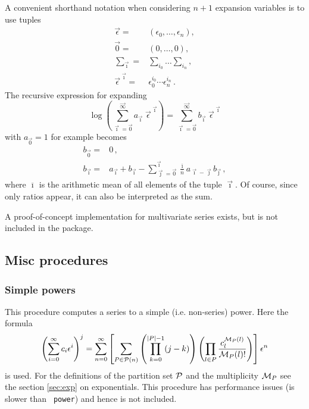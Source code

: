 \documentclass{article}
\begin{document}
A convenient shorthand notation when considering $n+1$ expansion variables is to
use tuples
\begin{align}
\label{eq:multivar_conv}
\vec{\epsilon}=&(\epsilon_0,\dots,\epsilon_n), \\
\vec{0}=&(0,\dots,0), \\
\sum_{\vec{\imath}}=&\sum_{i_0}\dots\sum_{i_n}, \\
\vec{\epsilon}^{\;\vec{\imath}} =& \epsilon_0^{i_0 }\cdots\epsilon_n^{i_n}\,.
\end{align}
The recursive expression for expanding
\begin{equation}
  \label{eq:log_multivar}
\log\left(\sum_{\vec{\imath}=\vec{0}}^{\vec{\infty}}a_{\vec{\imath}}\;
 \vec{\epsilon}^{\;\vec{\imath}}\right)=\sum_{\vec{\imath}=\vec{0}}^{\vec{\infty}} b_{\vec{\imath}}\;\vec{\epsilon}^{\;\vec{\imath}}
 \end{equation}
with $a_{\vec{0}}=1$ for example becomes
\begin{align}
  \label{eq:rec_log_multivar}
  b_{\vec{0}}=&0\,,\\
b_{\vec{\imath}}=&a_{\vec{\imath}}+b_{\vec{\imath}}-\sum_{\vec{\jmath}=\vec{0}}^{\vec{\imath}}
\frac{\overline{\imath}}{\overline{n}} a_{\vec{\imath}-\vec{\jmath}} b_{\vec{\jmath}}\,,
 \end{align}
where $\overline{\imath}$ is the arithmetic mean of all elements of the tuple
$\vec{\imath}$. Of course, since only ratios appear, it can also be
interpreted as the sum.

A proof-of-concept implementation for multivariate series exists, but is
not included in the package.

\subsection{Misc procedures}
\label{sec:proc_depr}

\subsubsection{Simple powers}
\label{sec:impl_simpl_pow}

This procedure computes a series to a simple
(i.e. non-series) power. Here the formula
\begin{equation}
  \label{eq:simpl_pow}
  \left(\sum_{i=0}^{\infty}c_i \epsilon^i\right)^j = \sum_{n=0}^\infty
  \left[\sum_{P \in {\cal P}(n)}\left(\prod_{k=0}^{|P|-1}
    (j-k)\right)\left(\prod_{l \in P} \frac{c^{{\cal M}_P(l)}_l}{{\cal M}_P(l)!} \right)\right]\epsilon^n
\end{equation}
is used. For the definitions of the partition set ${\cal P}$ and the
multiplicity ${\cal M}_P$ see the section \ref{sec:exp} on
exponentials. This procedure has performance issues (is slower than {\tt
  power}) and hence is not included.
\end{document}
